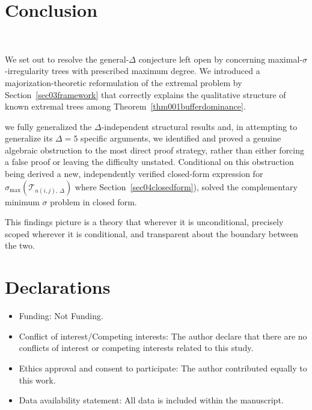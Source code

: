 \documentclass[12pt]{amsart}
\newcommand{\TT}{\mathcal{T}}
\begin{document}
\section{Conclusion}~\label{sec08conclusion}

We set out to resolve the general-$\Delta$ conjecture left open by
\cite{DimitrovPaper2025} concerning maximal-$\sigma$-irregularity trees with prescribed maximum degree. We introduced a majorization-theoretic reformulation of the extremal problem by Section~\ref{sec03framework} that correctly explains the qualitative structure of known extremal trees
among Theorem~\ref{thm001bufferdominance}. 

we fully generalized the $\Delta$-independent structural results and, in attempting to generalize its $\Delta=5$ specific arguments, we identified and proved a genuine algebraic obstruction to the most direct proof strategy, rather than either forcing a false proof or leaving the difficulty unstated. Conditional on this obstruction being derived a new, independently verified closed-form expression for
$\sigma_{\max}(\TT_{n(i,j),\,\Delta})$ where Section~\ref{sec04closedform}), solved the
complementary minimum $\sigma$ problem in closed form. 

This findings picture is a theory that  wherever it is unconditional, precisely scoped wherever it is conditional, and transparent about the boundary between the two.
 




\section*{Declarations}
\begin{itemize}
	\item Funding: Not Funding.
	\item Conflict of interest/Competing interests: The author declare that there are no conflicts of interest or competing interests related to this study.
	\item Ethics approval and consent to participate: The author contributed equally to this work.
	\item Data availability statement: All data is included within the manuscript.
\end{itemize}
\end{document}
